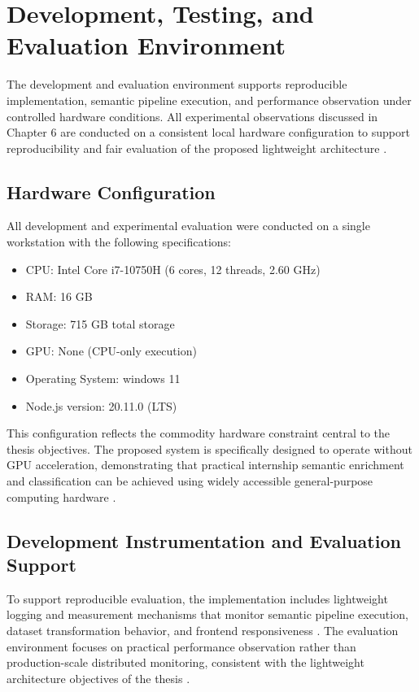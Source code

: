 \section{Development, Testing, and Evaluation Environment}
The development and evaluation environment supports reproducible implementation, semantic pipeline execution, and performance observation under controlled hardware conditions. All experimental observations discussed in Chapter 6 are conducted on a consistent local hardware configuration to support reproducibility and fair evaluation of the proposed lightweight architecture \cite{hevner2004design, wohlin2012experimentation, jain1991art}.
\subsection{Hardware Configuration}
All development and experimental evaluation were conducted on a single workstation with the following specifications:
\begin{itemize}
\item CPU: Intel Core i7-10750H (6 cores, 12 threads, 2.60 GHz)
\item RAM: 16 GB
\item Storage: 715 GB total storage
\item GPU: None (CPU-only execution)
\item Operating System: windows 11
\item Node.js version: 20.11.0 (LTS)
\end{itemize}
This configuration reflects the commodity hardware constraint central to the thesis objectives. The proposed system is specifically designed to operate without GPU acceleration, demonstrating that practical internship semantic enrichment and classification can be achieved using widely accessible general-purpose computing hardware \cite{schwartz2020green, menghani2023efficient}.
\subsection{Development Instrumentation and Evaluation Support}
To support reproducible evaluation, the implementation includes lightweight logging and measurement mechanisms that monitor semantic pipeline execution, dataset transformation behavior, and frontend responsiveness \cite{jain1991art, wohlin2012experimentation}.
The evaluation environment focuses on practical performance observation rather than production-scale distributed monitoring, consistent with the lightweight architecture objectives of the thesis \cite{jain1991art}.
